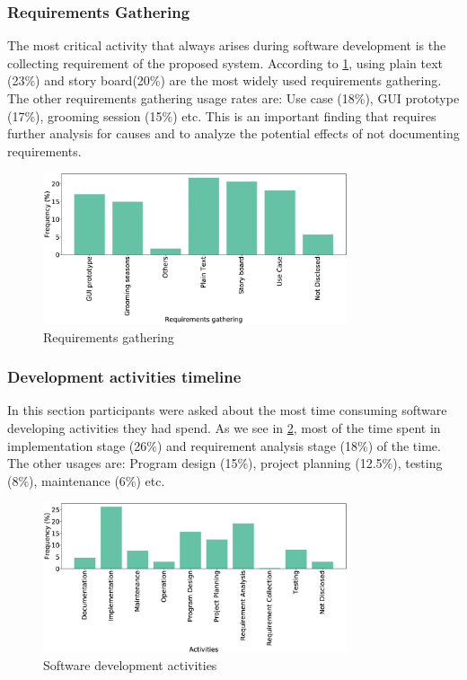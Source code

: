 \subsubsection{Requirements Gathering}
The most critical activity that always arises during software development is the collecting requirement of the proposed system. According to \cref{fig:requirements}, using plain text (23\%) and story board(20\%) are the most widely used requirements gathering. The other requirements gathering usage rates are: Use case (18\%), GUI prototype (17\%), grooming session (15\%) etc. This is an important finding that requires further analysis for causes and to analyze the potential effects of not documenting requirements.
\begin{figure}[]
\centering
  \includegraphics[width=0.8\textwidth]{Figures/Requirements_Gathering}
  \caption{Requirements gathering}
  \label{fig:requirements}
\end{figure}

\subsubsection{Development activities timeline}
In this section participants were asked about the most time consuming software developing activities they had spend. As we see in \cref{fig:activities}, most of the time spent in implementation stage (26\%) and requirement analysis stage (18\%) of the time. The other usages are: Program design (15\%), project planning (12.5\%), testing (8\%), maintenance (6\%) etc.
\begin{figure}[]
\centering
  \includegraphics[width=0.8\textwidth]{Figures/Respondents_Activities}
  \caption{Software development activities}
  \label{fig:activities}
\end{figure}